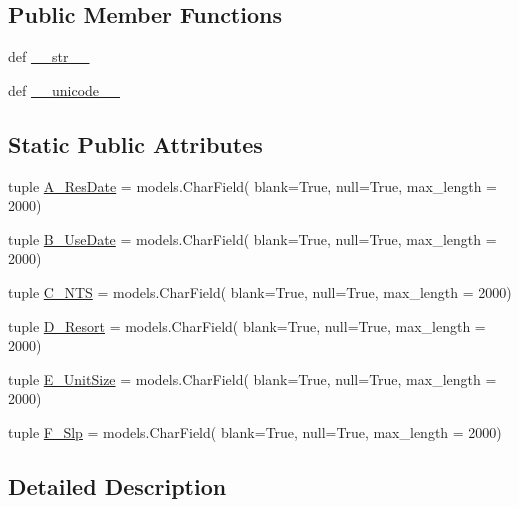 \subsection*{Public Member Functions}
\begin{DoxyCompactItemize}
\item 
def \hyperlink{classguest__reservation__manager_1_1models_1_1RuthSheet_a6e0a47e6fee4d4c64817cf5684e5bbdb}{\-\_\-\-\_\-str\-\_\-\-\_\-}
\item 
def \hyperlink{classguest__reservation__manager_1_1models_1_1RuthSheet_a02fa22fea9f08cebb5b673daf2bb55ff}{\-\_\-\-\_\-unicode\-\_\-\-\_\-}
\end{DoxyCompactItemize}
\subsection*{Static Public Attributes}
\begin{DoxyCompactItemize}
\item 
tuple \hyperlink{classguest__reservation__manager_1_1models_1_1RuthSheet_a7a1b41e8b3f8694520a49775c9d33cbb}{A\-\_\-\-Res\-Date} = models.\-Char\-Field( blank=True, null=True, max\-\_\-length = 2000)
\item 
tuple \hyperlink{classguest__reservation__manager_1_1models_1_1RuthSheet_a63241ce746b320b58e2831465f4c5271}{B\-\_\-\-Use\-Date} = models.\-Char\-Field( blank=True, null=True, max\-\_\-length = 2000)
\item 
tuple \hyperlink{classguest__reservation__manager_1_1models_1_1RuthSheet_a7ba8fa55b42241acbc4a43e31114d4ff}{C\-\_\-\-N\-T\-S} = models.\-Char\-Field( blank=True, null=True, max\-\_\-length = 2000)
\item 
tuple \hyperlink{classguest__reservation__manager_1_1models_1_1RuthSheet_aef196aa193d1942c16b4793086489ed4}{D\-\_\-\-Resort} = models.\-Char\-Field( blank=True, null=True, max\-\_\-length = 2000)
\item 
tuple \hyperlink{classguest__reservation__manager_1_1models_1_1RuthSheet_a9a56b24a74583dd22ca14d2926f62fba}{E\-\_\-\-Unit\-Size} = models.\-Char\-Field( blank=True, null=True, max\-\_\-length = 2000)
\item 
tuple \hyperlink{classguest__reservation__manager_1_1models_1_1RuthSheet_ae107dd55fc2d50eb83049985378027ea}{F\-\_\-\-Slp} = models.\-Char\-Field( blank=True, null=True, max\-\_\-length = 2000)
\end{DoxyCompactItemize}


\subsection{Detailed Description}


